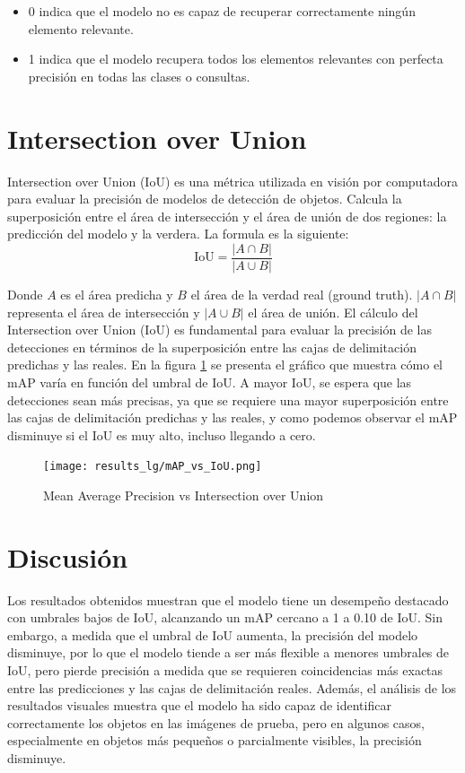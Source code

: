 \documentclass{article}
\begin{document}
\begin{itemize}
  \item 0 indica que el modelo no es capaz de recuperar correctamente ningún elemento relevante.
  \item 1 indica que el modelo recupera todos los elementos relevantes con perfecta precisión en todas las clases o consultas.
\end{itemize}

\section{Intersection over Union}
Intersection over Union (IoU) \cite{padilla2020survey} es una métrica utilizada en visión por computadora para evaluar la precisión de modelos de detección de objetos. Calcula la
superposición entre el área de intersección y el área de unión de dos regiones: la predicción del modelo y la verdera. La formula es la siguiente: 
\[
\text{IoU} = \frac{|A \cap B|}{|A \cup B|}
\]

Donde \( A \) es el área predicha y \( B \) el área de la verdad real (ground truth). \( |A \cap B| \) representa el área de intersección y \( |A \cup B| \) el área de unión.
El cálculo del Intersection over Union (IoU) es fundamental para evaluar la precisión de las detecciones en términos de la superposición entre las cajas de delimitación predichas y las reales.
En la figura \ref{fig:mAP} se presenta el gráfico que muestra cómo el mAP varía en función del umbral de IoU.
A mayor IoU, se espera que las detecciones sean más precisas, ya que se requiere una mayor superposición entre las cajas de delimitación predichas y las reales, y como podemos observar el mAP disminuye
si el IoU es muy alto, incluso llegando a cero.

\begin{figure}[!ht]
    \centering
    \texttt{[image: results\_lg/mAP\_vs\_IoU.png]}
    \caption{Mean Average Precision vs Intersection over Union}
    \label{fig:mAP}
\end{figure}

\section{Discusión}
Los resultados obtenidos muestran que el modelo tiene un desempeño destacado con umbrales bajos de IoU, alcanzando un mAP cercano a 1 a 0.10 de IoU. 
Sin embargo, a medida que el umbral de IoU aumenta, la precisión del modelo disminuye, por lo que el modelo tiende a ser más flexible a menores umbrales de IoU, pero pierde precisión a medida que se requieren coincidencias más exactas entre las predicciones y las cajas de delimitación reales.
Además, el análisis de los resultados visuales muestra que el modelo ha sido capaz de identificar correctamente los objetos en las imágenes de prueba, pero en algunos casos, especialmente en objetos más pequeños o parcialmente visibles, la precisión disminuye.
\end{document}
